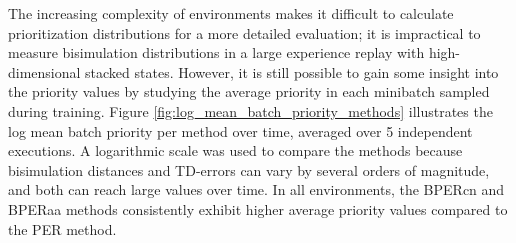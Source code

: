 

The increasing complexity of environments makes it difficult to calculate prioritization distributions for a more detailed evaluation; it is impractical to measure bisimulation distributions in a large experience replay with high-dimensional stacked states. However, it is still possible to gain some insight into the priority values by studying the average priority in each minibatch sampled during training. Figure \ref{fig:log_mean_batch_priority_methods} illustrates the log mean batch priority per method over time, averaged over 5 independent executions. A logarithmic scale was used to compare the methods because bisimulation distances and TD-errors can vary by several orders of magnitude, and both can reach large values over time. In all environments, the BPERcn and BPERaa methods consistently exhibit higher average priority values compared to the PER method.

